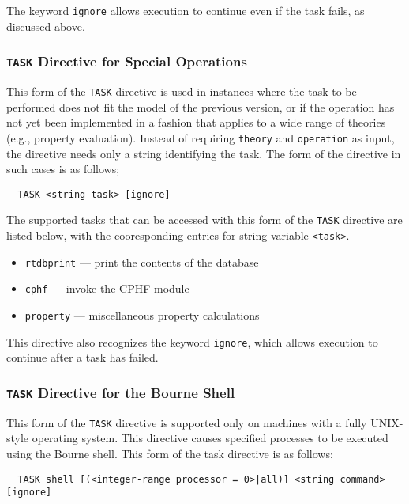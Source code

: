 The keyword \verb+ignore+ allows execution to continue even if the
task fails, as discussed above.

\subsubsection{{\tt TASK} Directive for Special Operations}

This form of the \verb+TASK+ directive is used in instances where the
task to be performed does not fit the model of the previous version, or
if the operation has not yet been implemented in a fashion that
applies to a wide range of theories (e.g., property evaluation).
Instead of requiring \verb+theory+ and \verb+operation+ as input, the
directive needs only a string identifying the task.  The form of the
directive in such cases is as follows;

\begin{verbatim}
  TASK <string task> [ignore]
\end{verbatim}

The supported tasks that can be accessed with this form of the \verb+TASK+
directive are listed
below, with the cooresponding entries for string variable \verb+<task>+.

\begin{itemize}
  \item \verb+rtdbprint+ --- print the contents of the database
  \item \verb+cphf+ --- invoke the CPHF module
  \item \verb+property+ --- miscellaneous property calculations
\end{itemize}

This directive also recognizes the keyword \verb+ignore+, which allows
execution to continue after a task has failed.

\subsubsection{{\tt TASK} Directive for the Bourne Shell}

This form of the \verb+TASK+ directive is supported only on machines
with a fully UNIX-style operating system.  This directive causes
specified processes to be executed using the Bourne shell.  This form
of the task directive is as follows;

\begin{verbatim}
  TASK shell [(<integer-range processor = 0>|all)] <string command> [ignore]
\end{verbatim}

